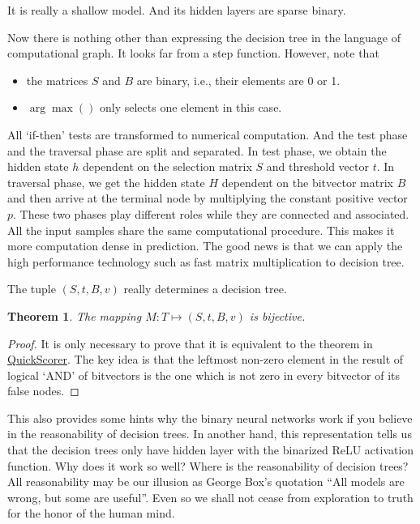 \documentclass[UTF8]{article}
\newtheorem{theorem}{Theorem}
\newtheorem{proof}{Proof}[section]
\begin{document}
It is really a shallow model.
And its hidden layers are sparse binary.

Now there is nothing other than expressing the decision tree in the language of computational graph.
It looks  far from a step function. However, note that
\begin{itemize}
\item the matrices $S$ and $B$ are binary, i.e., their elements are 0 or 1.
\item $\arg\max()$ only selects one element in this case.
\end{itemize}
All `if-then' tests are transformed to numerical computation.
And the test phase and the traversal phase are split and separated.
In test phase, we obtain the hidden state $h$ dependent on the selection matrix $S$ and threshold vector $t$.
In traversal phase, we get the hidden state $H$ dependent on the bitvector matrix $B$
and then arrive at the terminal node by multiplying the constant positive vector $p$.
These two phases play different roles while they are connected and associated.
All the input samples share the same computational procedure.
This makes it more computation dense in prediction.
The good news is that we can apply the high performance technology such as fast matrix multiplication
to decision tree.

The tuple $(S, t, B, v)$ really determines a decision tree.

\begin{theorem}
The mapping $M: T \mapsto (S, t, B, v)$ is bijective.
\end{theorem}
\begin{proof}
It is only necessary to prove that it is equivalent to the theorem in
\href{http://pages.di.unipi.it/rossano/wp-content/uploads/sites/7/2015/11/sigir15.pdf}{QuickScorer}.
The key idea is that the leftmost non-zero element in the result of logical `AND' of bitvectors
is the one which is not zero in every bitvector of its false nodes.
\end{proof}



This also provides some hints why the binary neural networks work
if you believe in the reasonability of decision trees.
In another hand, this representation tells us that
the decision trees only have hidden layer with the binarized ReLU activation function.
Why does it work so well?
Where is the reasonability of decision trees?
All reasonability may be our illusion as George Box's quotation
``All models are wrong, but some are useful''.
Even so we shall not cease from exploration to truth for the honor of the human mind.
\end{document}
